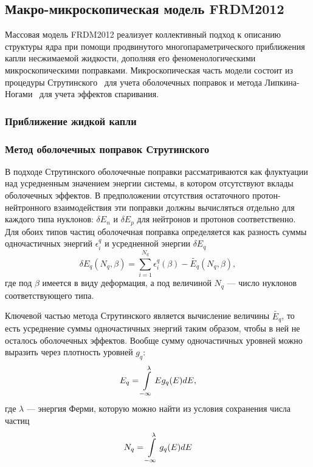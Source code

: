 \subsection{Макро-микроскопическая модель FRDM2012}
Массовая модель FRDM2012 реализует коллективный подход к описанию структуры ядра при помощи продвинутого многопараметрического приближения капли несжимаемой жидкости, дополняя его феноменологическими микроскопическими поправками. Микроскопическая часть модели состоит из процедуры Струтинского~\cite{strutinsky1966, strutinsky1967} для учета оболочечных поправок и метода Липкина-Ногами~\cite{lipkin1960, nogami1964} для учета эффектов спаривания.

\subsubsection{Приближение жидкой капли}

\subsubsection{Метод оболочечных поправок Струтинского}
В подходе Струтинского оболочечные поправки рассматриваются как флуктуации над усредненным значением энергии системы, в котором отсутствуют вклады оболочечных эффектов. В предположении отсутствия остаточного протон-нейтронного взаимодействия эти поправки должны вычисляться отдельно для каждого типа нуклонов: $\delta E_n$ и $\delta E_p$ для нейтронов и протонов соответственно. Для обоих типов частиц оболочечная поправка определяется как разность суммы одночастичных энергий $\epsilon^q_i$ и усредненной энергии $\delta{E_q}$
\begin{equation}
\delta E_q(N_q, \beta) = \sum^{N_q}_{i = 1} \epsilon^q_i(\beta) - \tilde{E_q}(N_q, \beta),
\end{equation}
где под $\beta$ имеется в виду деформация, а под величиной $N_q$ --- число нуклонов соответствующего типа. 

Ключевой частью метода Струтинского является вычисление величины $\tilde{E_q}$, то есть усреднение суммы одночастичных энергий таким образом, чтобы в ней не осталось оболочечных эффектов. Вообще сумму одночастичных уровней можно выразить через плотность уровней $g_q$:
\begin{equation}
E_q = \int\displaylimits^\lambda_{-\infty} E g_q(E) dE,
\end{equation}
где $\lambda$ --- энергия Ферми, которую можно найти из условия сохранения числа частиц
\begin{equation}
N_q = \int\displaylimits^\lambda_{-\infty} g_q(E) dE
\end{equation}

